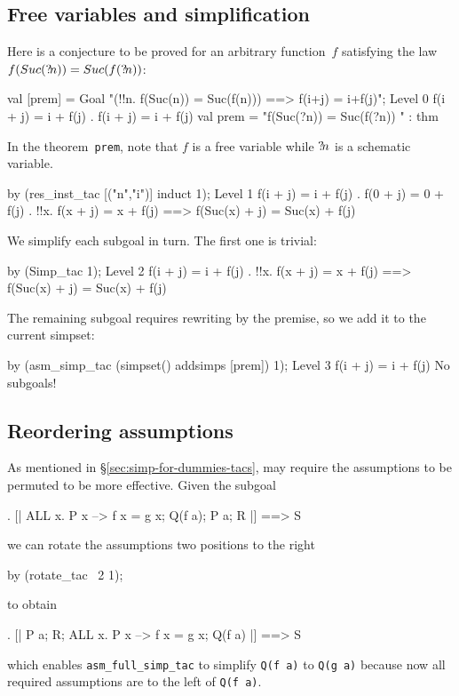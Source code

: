 \subsection{Free variables and simplification}

Here is a conjecture to be proved for an arbitrary function~$f$
satisfying the law $f(Suc({?\!n})) = Suc(f({?\!n}))$:
\begin{ttbox}
val [prem] = Goal "(!!n. f(Suc(n)) = Suc(f(n))) ==> f(i+j) = i+f(j)";
{\out Level 0}
{\out f(i + j) = i + f(j)}
{. f(i + j) = i + f(j)}
\ttbreak
{\out val prem = "f(Suc(?n)) = Suc(f(?n))}
{\out             [!!n. f(Suc(n)) = Suc(f(n))]" : thm}
\end{ttbox}
In the theorem~\texttt{prem}, note that $f$ is a free variable while
${?\!n}$ is a schematic variable.
\begin{ttbox}
by (res_inst_tac [("n","i")] induct 1);
{\out Level 1}
{\out f(i + j) = i + f(j)}
{. f(0 + j) = 0 + f(j)}
{. !!x. f(x + j) = x + f(j) ==> f(Suc(x) + j) = Suc(x) + f(j)}
\end{ttbox}
We simplify each subgoal in turn.  The first one is trivial:
\begin{ttbox}
by (Simp_tac 1);
{\out Level 2}
{\out f(i + j) = i + f(j)}
{. !!x. f(x + j) = x + f(j) ==> f(Suc(x) + j) = Suc(x) + f(j)}
\end{ttbox}
The remaining subgoal requires rewriting by the premise, so we add it
to the current simpset:
\begin{ttbox}
by (asm_simp_tac (simpset() addsimps [prem]) 1);
{\out Level 3}
{\out f(i + j) = i + f(j)}
{\out No subgoals!}
\end{ttbox}

\subsection{Reordering assumptions}
\label{sec:reordering-asms}

As mentioned in \S\ref{sec:simp-for-dummies-tacs},
 may require the assumptions to be permuted
to be more effective.  Given the subgoal
\begin{ttbox}
{. [| ALL x. P x --> f x = g x; Q(f a); P a; R |] ==> S}
\end{ttbox}
we can rotate the assumptions two positions to the right
\begin{ttbox}
by (rotate_tac ~2 1);
\end{ttbox}
to obtain
\begin{ttbox}
{. [| P a; R; ALL x. P x --> f x = g x; Q(f a) |] ==> S}
\end{ttbox}
which enables \verb$asm_full_simp_tac$ to simplify \verb$Q(f a)$ to
\verb$Q(g a)$ because now all required assumptions are to the left of
\verb$Q(f a)$.

